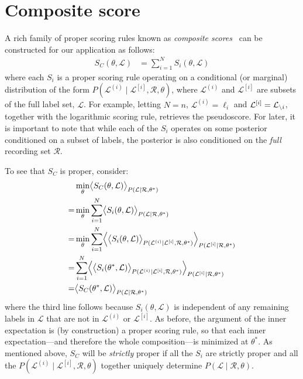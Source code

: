 \documentclass[a4paper,oneside,12pt,english]{report}
\def\expv#1#2{\bigl\langle#1\bigr\rangle_{#2}}
\def\Expv#1#2{\Bigl\langle#1\Bigr\rangle_{#2}}
\def\Lset{\mathcal{L}}
\def\Rset{\mathcal{R}}
\begin{document}
\section{Composite score}
A rich family of proper scoring rules known as \emph{composite scores}~\cite{Dawid_Musio_ThApp_PSR_2014} can be constructed for our application as follows:
\begin{align}
S_C(\theta,\Lset) &= \sum_{i=1}^N S_i(\theta,\Lset)
\end{align}
where each $S_i$ is a proper scoring rule operating on a conditional (or marginal) distribution of the form $P(\Lset^{(i)}\mid\Lset^{[i]},\Rset,\theta)$, where $\Lset^{(i)}$ and $\Lset^{[i]}$ are subsets of the full label set, $\Lset$. For example, letting $N=n$, $\Lset^{(i)}=\ell_i$ and $\Lset^{[i]}=\Li$, together with the logarithmic scoring rule, retrieves the pseudoscore. For later, it is important to note that while each of the $S_i$ operates on some posterior conditioned on a subset of labels, the posterior is also  conditioned on the \emph{full} recording set $\Rset$.   

To see that $S_C$ is proper, consider:
\begin{align}
\begin{split}
&\min_\theta \expv{S_C(\theta,\Lset)}{P(\Lset\mid\Rset,\theta^*)}\\
=&\min_\theta \sum_{i=1}^N \expv{S_i(\theta,\Lset)}{P(\Lset\mid\Rset,\theta^*)} \\
=&\min_\theta \sum_{i=1}^N \Expv{\expv{S_i(\theta,\Lset)}{P(\Lset^{(i)}\mid\Lset^{[i]},\Rset,\theta^*)}}{P(\Lset^{[i]}\mid\Rset,\theta^*)} \\
=&\sum_{i=1}^N \Expv{\expv{S_i(\theta^*,\Lset)}{P(\Lset^{(i)}\mid\Lset^{[i]},\Rset,\theta^*)}}{P(\Lset^{[i]}\mid\Rset,\theta^*)} \\
=& \expv{S_C(\theta^*,\Lset)}{P(\Lset\mid\Rset,\theta^*)}
\end{split}
\end{align}
where the third line follows because $S_i(\theta,\Lset)$ is independent of any remaining labels in $\Lset$ that are not in $\Lset^{(i)}$ or $\Lset^{[i]}$. As before, the argument of the inner expectation is (by construction) a proper scoring rule, so that each inner expectation---and therefore the whole composition---is minimized at $\theta^*$. As mentioned above, $S_C$ will be \emph{strictly} proper if all the $S_i$ are strictly proper and all the $P(\Lset^{(i)}\mid\Lset^{[i]},\Rset,\theta)$ together uniquely determine $P(\Lset\mid\Rset,\theta)$.
\end{document}
